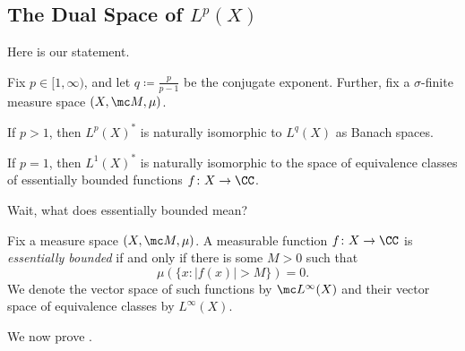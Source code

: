 \documentclass[../notes.tex]{subfiles}
\begin{document}
\subsection{The Dual Space of \texorpdfstring{$L^p(X)$}{Lp}}
Here is our statement.
\begin{theorem} \label{thm:dual-lp}
	Fix $p\in[1,\infty)$, and let $q\coloneqq\frac p{p-1}$ be the conjugate exponent. Further, fix a $\sigma$-finite measure space $(X,\mc M,\mu)$.
	\begin{listalph}
		\item If $p>1$, then $L^p(X)^*$ is naturally isomorphic to $L^q(X)$ as Banach spaces.
		\item If $p=1$, then $L^1(X)^*$ is naturally isomorphic to the space of equivalence classes of essentially bounded functions $f\colon X\to\CC$.
	\end{listalph}
\end{theorem}
Wait, what does essentially bounded mean?
\begin{definition}
	Fix a measure space $(X,\mc M,\mu)$. A measurable function $f\colon X\to\CC$ is \textit{essentially bounded} if and only if there is some $M>0$ such that
	\[\mu(\{x:\left|f(x)\right|>M\})=0.\]
	We denote the vector space of such functions by $\mc L^\infty(X)$ and their vector space of equivalence classes by $L^\infty(X)$.
\end{definition}
We now prove .
\end{document}
